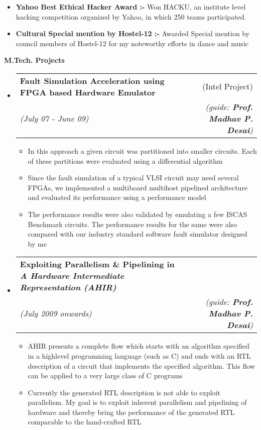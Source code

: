 \documentclass[a4paper,11pt,times]{res}
\makeatletter
\newcommand{\smalitem}[1]{\item #1 \vspace{-4pt}}
\newcommand{\resheading}[1]{{\large \colorbox{mygrey}{\begin{minipage}{\textwidth}{\textbf{#1 \vphantom{p\^{E}}}}\end{minipage}}\vspace{4pt}}}
\newcommand{\ressubheading}[4]{
\begin{tabular*}{172mm}{l@{\extracolsep{\fill}}r}
		\textbf{#1} & #2 \\
		\textit{#3} & \textit{#4} \\
\end{tabular*}\vspace{4pt}}
\makeatother
\begin{document}
\begin{itemize}
\smalitem{{\bf Yahoo Best Ethical Hacker Award :-}
Won HACKU, an institute level hacking competition organized by Yahoo, in which 250 teams participated.}
\smalitem{{\bf Cultural Special mention by Hostel-12 :-}
Awarded Special mention by council members of Hostel-12 for my noteworthy efforts in dance and music}
\end{itemize}


\resheading{M.Tech. Projects}
\begin{itemize}
\vspace{-5pt}
\item
\ressubheading{Fault Simulation Acceleration using FPGA based Hardware Emulator} {(Intel Project)}{(July 07 - June 09)}{\hspace{-2 cm}(guide: {\bf{Prof. Madhav P. Desai}})} 
\begin{itemize}
	\vspace{-7pt}
\smalitem{In this approach a given circuit was partitioned into smaller circuits. Each of these partitions were evaluated using a differential algorithm }
\smalitem{Since the fault simulation of a typical VLSI circuit may need several FPGAs, we implemented a multiboard multihost pipelined architecture and evaluated its performance using a performance model}
\smalitem{The performance results were also validated by emulating a few ISCAS Benchmark circuits. The performance results for the same were also compared with our industry standard software fault simulator designed by me }
\end{itemize}

\item
\vspace{5pt}
\ressubheading{Exploiting Parallelism \&  Pipelining in {\it A Hardware Intermediate Representation (AHIR)}}{}{(July 2009 onwards)}{\hspace{-1.8 in}(guide: \it{\bf{Prof. Madhav P. Desai}})}
	\begin{itemize}
	\vspace{-7pt}
\smalitem{
AHIR presents a complete flow which starts with an algorithm specified in a high­level programming 
language (such as C) and ends with an RTL description of a circuit that implements the specified 
algorithm. This flow can be applied to a very large class of C programs
}
\smalitem{ Currently the generated RTL description is not able to exploit parallelism.
My goal is to exploit inherent parallelism and pipelining of hardware and thereby bring the performance of the generated RTL comparable to the hand-crafted RTL }

\end{itemize}
\end{itemize}
\end{document}
